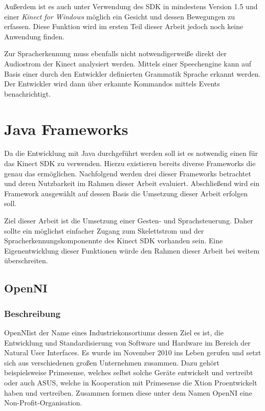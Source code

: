 \newpage
Au\ss erdem ist es auch unter Verwendung des SDK in mindestens Version 1.5 und einer \textit{Kinect for Windows} m\"oglich 
ein Gesicht und dessen Bewegungen zu erfassen\footnotemark[5]. Diese Funktion wird im ersten Teil dieser Arbeit jedoch noch keine Anwendung finden.
\par\smallskip 
Zur Spracherkennung muss ebenfalls nicht notwendigerwei\ss e direkt der Audiostrom der Kinect analysiert werden. Mittels einer Speechengine kann auf Basis 
einer durch den Entwickler definierten Grammatik Sprache erkannt werden. Der Entwickler wird dann \"uber erkannte Kommandos mittels Events benachrichtigt. 

\section{Java Frameworks}

Da die Entwicklung mit Java durchgef\"uhrt werden soll ist es notwendig einen  f\"ur das Kinect SDK zu verwenden.
Hierzu existieren bereits diverse Frameworks die genau das erm\"oglichen.
Nachfolgend werden drei dieser Frameworks betrachtet und deren Nutzbarkeit im Rahmen dieser Arbeit evaluiert.
Abschlie\ss end wird ein Framework ausgew\"ahlt auf dessen Basis die Umsetzung dieser Arbeit erfolgen soll.
\par\smallskip 
Ziel dieser Arbeit ist die Umsetzung einer Gesten- und Sprachsteuerung. Daher sollte ein m\"oglichst einfacher Zugang zum Skelettstrom und der 
Spracherkennungskomponennte des Kinect SDK vorhanden sein. Eine Eigenentwicklung dieser Funktionen w\"urde den Rahmen dieser Arbeit bei weitem \"uberschreiten.


\subsection{OpenNI}

\subsubsection{Beschreibung}
\gls{OpenNI}\footnotemark[7] ist der Name eines Industriekonsortiums dessen Ziel es ist, die Entwicklung und Standardisierung von Software und Hardware 
im Bereich der Natural User Interfaces.
Es wurde im November 2010 ins Leben gerufen und setzt sich aus verschiedenen großen Unternehmen zusammen. Dazu geh\"ort beispielsweise Primesense, 
welches selbst solche Ger\"ate entwickelt und vertreibt oder auch ASUS, welche in Kooperation mit Primesense die Xtion Pro\footnotemark[9] entwickelt haben und vertreiben.
Zusammen formen diese unter dem Namen OpenNI eine Non-Profit-Organisation.

